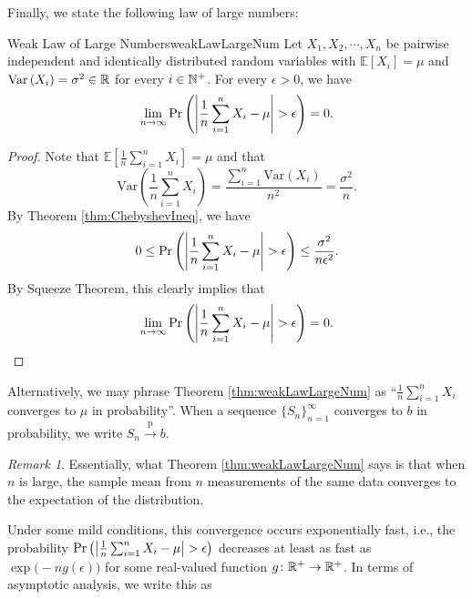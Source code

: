\documentclass[math]{amznotes}
\theoremstyle{remark}
\newtheorem*{remark}{Remark}
\begin{document}
Finally, we state the following law of large numbers:
\begin{thmbox}{Weak Law of Large Numbers}{weakLawLargeNum}
    Let $X_1, X_2, \cdots, X_n$ be pairwise independent and identically distributed random variables with $\mathbb{E}[X_i] = \mu$ and $\mathrm{Var}\left(X_i\right) = \sigma^2 \in \mathbb{R}$ for every $i \in \mathbb{N}^+$. For every $\epsilon > 0$, we have 
    \begin{equation*}
        \lim_{n \to \infty}\mathrm{Pr}\left({\left\lvert {\frac{1}{n}\sum_{i = 1}^nX_i - \mu} \right\rvert} > \epsilon\right) = 0.
    \end{equation*}
    \tcblower
    \begin{proof}
        Note that $\mathbb{E}\left[\frac{1}{n}\sum_{i = 1}^nX_i\right] = \mu$ and that 
        \begin{equation*}
            \mathrm{Var}\left(\frac{1}{n}\sum_{i = 1}^nX_i\right) = \frac{\sum_{i = 1}^{n}\mathrm{Var}\left(X_i\right)}{n^2} = \frac{\sigma^2}{n}.
        \end{equation*}
        By Theorem \ref{thm:ChebyshevIneq}, we have 
        \begin{equation*}
            0 \leq \mathrm{Pr}\left({\left\lvert {\frac{1}{n}\sum_{i = 1}^nX_i - \mu} \right\rvert} > \epsilon\right) \leq \frac{\sigma^2}{n\epsilon^2}.
        \end{equation*}
        By Squeeze Theorem, this clearly implies that 
        \begin{equation*}
            \lim_{n \to \infty}\mathrm{Pr}\left({\left\lvert {\frac{1}{n}\sum_{i = 1}^nX_i - \mu} \right\rvert} > \epsilon\right) = 0.
        \end{equation*}
    \end{proof}
\end{thmbox}
Alternatively, we may phrase Theorem \ref{thm:weakLawLargeNum} as ``$\frac{1}{n}\sum_{i = 1}^nX_i$ converges to $\mu$ in probability''. When a sequence $\{S_n\}_{n = 1}^{\infty}$ converges to $b$ in probability, we write $S_n \xrightarrow{\mathrm{p}} b$. 
\begin{notebox}
    \begin{remark}
        Essentially, what Theorem \ref{thm:weakLawLargeNum} says is that when $n$ is large, the sample mean from $n$ measurements of the same data converges to the expectation of the distribution.
    \end{remark}
\end{notebox}
Under some mild conditions, this convergence occurs exponentially fast, i.e., the probability $\mathrm{Pr}\left({\left\lvert {\frac{1}{n}\sum_{i = 1}^nX_i - \mu} \right\rvert} > \epsilon\right)$ decreases at least as fast as $\exp\bigl(-ng\left(\epsilon\right)\bigr)$ for some real-valued function $g \colon \mathbb{R}^+ \to \mathbb{R}^+$. In terms of asymptotic analysis, we write this as 
\end{document}
